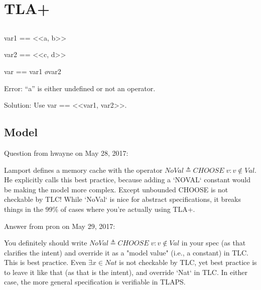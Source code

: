 
\chapter{TLA+}	\label{chapter:tla}

\section{}	\label{section:unchanged}

var1 == <<a, b>>

var2 == <<c, d>>

var == var1 \o var2

Error: ``a'' is either undefined or not an operator.

Solution: Use var == <<var1, var2>>.

\section{Model}	\label{section:model}

Question from hwayne on May 28, 2017:

Lamport defines a memory cache with the operator $NoVal \triangleq CHOOSE\; v : v \notin Val$.
He explicitly calls this best practice, because adding a `NOVAL` constant would be making the model more complex. 
Except unbounded CHOOSE is not checkable by TLC! 
While `NoVal` is nice for abstract specifications, 
it breaks things in the 99\% of cases where you're actually using TLA+.

Answer from pron on May 29, 2017:

You definitely should write $NoVal \triangleq CHOOSE\; v : v \notin Val$ in your spec 
(as that clarifies the intent) and override it as a "model value" (i.e., a constant) in TLC. 
This is best practice. 
Even $\exists x \in Nat$ is not checkable by TLC, 
yet best practice is to leave it like that (as that is the intent), 
and override `Nat` in TLC. 
In either case, the more general specification is verifiable in TLAPS.
